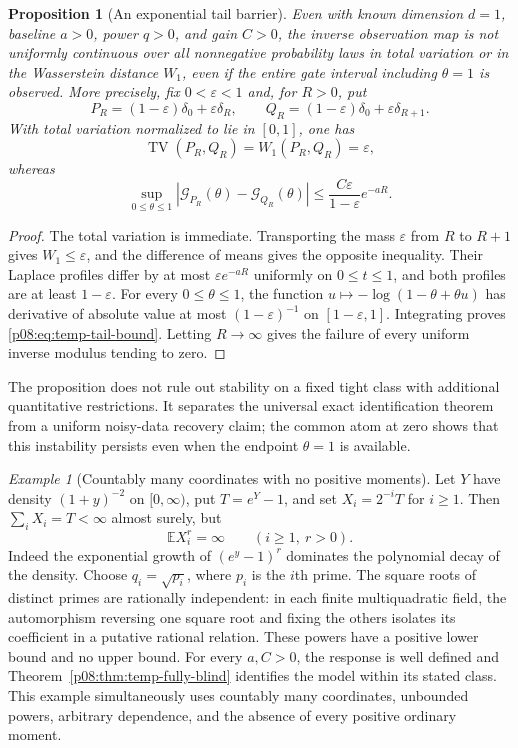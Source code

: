 \documentclass[11pt,letterpaper]{article}
\newtheorem{proposition}[theorem]{Proposition}
\theoremstyle{definition}
\theoremstyle{remark}
\newtheorem{example}[theorem]{Example}
\newcommand{\E}{\mathbb E}
\newcommand{\1}{\mathbf 1}
\begin{document}
\begin{proposition}[An exponential tail barrier]
\label{p08:prop:temp-tail-barrier}
Even with known dimension $d=1$, baseline $a>0$, power $q>0$, and
gain $C>0$, the inverse observation map is not uniformly continuous
over all nonnegative probability laws in total variation or in the
Wasserstein distance $W_1$, even if the entire gate interval including
$\theta=1$ is observed. More precisely, fix $0<\varepsilon<1$ and,
for $R>0$, put
\[
 P_R=(1-\varepsilon)\delta_0+\varepsilon\delta_R,
 \qquad Q_R=(1-\varepsilon)\delta_0+\varepsilon\delta_{R+1}.
\]
With total variation normalized to lie in $[0,1]$, one has
\[
     \operatorname{TV}(P_R,Q_R)=W_1(P_R,Q_R)=\varepsilon,
\]
whereas
\begin{equation}\label{p08:eq:temp-tail-bound}
 \sup_{0\leq\theta\leq1}
       |\mathcal G_{P_R}(\theta)-\mathcal G_{Q_R}(\theta)|
       \leq\frac{C\varepsilon}{1-\varepsilon}e^{-aR}.
\end{equation}
\end{proposition}
\begin{proof}
The total variation is immediate. Transporting the mass $\varepsilon$
from $R$ to $R+1$ gives $W_1\leq\varepsilon$, and the difference
of means gives the opposite inequality. Their Laplace profiles differ
by at most $\varepsilon e^{-aR}$ uniformly on $0\leq t\leq1$, and
both profiles are at least $1-\varepsilon$. For every
$0\leq\theta\leq1$, the function
$u\mapsto-\log(1-\theta+\theta u)$ has derivative of absolute value
at most $(1-\varepsilon)^{-1}$ on $[1-\varepsilon,1]$.
Integrating proves \eqref{p08:eq:temp-tail-bound}. Letting $R\to\infty$
gives the failure of every uniform inverse modulus tending to zero.
\end{proof}

The proposition does not rule out stability on a fixed tight class
with additional quantitative restrictions. It separates the universal
exact identification theorem from a uniform noisy-data recovery claim;
the common atom at zero shows that this instability persists even when
the endpoint $\theta=1$ is available.


\begin{example}[Countably many coordinates with no positive moments]
\label{p08:ex:no-positive-moments}
Let $Y$ have density $(1+y)^{-2}$ on $[0,\infty)$, put $T=e^Y-1$,
and set $X_i=2^{-i}T$ for $i\geq1$. Then
$\sum_iX_i=T<\infty$ almost surely, but
\[
             \E X_i^r=\infty\qquad(i\geq1,\ r>0).
\]
Indeed the exponential growth of $(e^y-1)^r$ dominates the polynomial
decay of the density. Choose $q_i=\sqrt{p_i}$, where $p_i$ is the
$i$th prime. The square roots of distinct primes are rationally
independent: in each finite multiquadratic field, the automorphism
reversing one square root and fixing the others isolates its coefficient
in a putative rational relation. These powers have a positive lower
bound and no upper bound. For every $a,C>0$, the response is well
defined and Theorem~\ref{p08:thm:temp-fully-blind} identifies the model
within its stated class. This example simultaneously uses countably
many coordinates, unbounded powers, arbitrary dependence, and the
absence of every positive ordinary moment.
\end{example}
\end{document}
